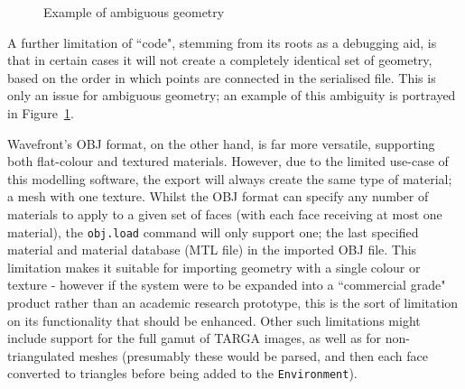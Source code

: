 \documentclass[a4paper,10pt]{report}
\begin{document}
\begin{itemize}
{\begin{figure}[t]
    \quad
    \caption{Example of ambiguous geometry}
    \label{geoambig}
\end{figure}

A further limitation of ``code", stemming from its roots as a debugging aid, is that in certain cases it will not create a completely identical set of geometry, based on the order in which points are connected in the serialised file. This is only an issue for ambiguous geometry; an example of this ambiguity is portrayed in Figure~\ref{geoambig}.

Wavefront's OBJ format, on the other hand, is far more versatile, supporting both flat-colour and textured materials. However, due to the limited use-case of this modelling software, the export will always create the same type of material; a mesh with one texture. Whilst the OBJ format can specify any number of materials to apply to a given set of faces (with each face receiving at most one material), the \texttt{obj.load} command will only support one; the last specified material and material database (MTL file) in the imported OBJ file. This limitation makes it suitable for importing geometry with a single colour or texture - however if the system were to be expanded into a ``commercial grade" product rather than an academic research prototype, this is the sort of limitation on its functionality that should be enhanced. Other such limitations might include support for the full gamut of TARGA images, as well as for non-triangulated meshes (presumably these would be parsed, and then each face converted to triangles before being added to the \texttt{Environment}).
 }
\end{itemize}
\end{document}
